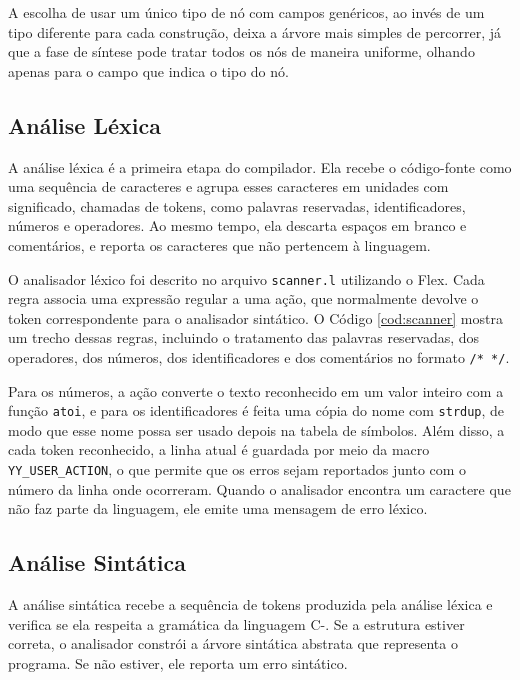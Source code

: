 \documentclass[
	12pt,				%
	oneside,
	a4paper,			%
	english,			%
	french,				%
	spanish,			%
	brazil,				%
	]{abntex2}
\begin{document}


A escolha de usar um único tipo de nó com campos genéricos, ao invés de um tipo diferente para cada construção, deixa a árvore mais simples de percorrer, já que a fase de síntese pode tratar todos os nós de maneira uniforme, olhando apenas para o campo que indica o tipo do nó.

\subsection{Análise Léxica}
A análise léxica é a primeira etapa do compilador. Ela recebe o código-fonte como uma sequência de caracteres e agrupa esses caracteres em unidades com significado, chamadas de tokens, como palavras reservadas, identificadores, números e operadores. Ao mesmo tempo, ela descarta espaços em branco e comentários, e reporta os caracteres que não pertencem à linguagem.

O analisador léxico foi descrito no arquivo \texttt{scanner.l} utilizando o Flex. Cada regra associa uma expressão regular a uma ação, que normalmente devolve o token correspondente para o analisador sintático. O Código \ref{cod:scanner} mostra um trecho dessas regras, incluindo o tratamento das palavras reservadas, dos operadores, dos números, dos identificadores e dos comentários no formato \texttt{/* */}.



Para os números, a ação converte o texto reconhecido em um valor inteiro com a função \texttt{atoi}, e para os identificadores é feita uma cópia do nome com \texttt{strdup}, de modo que esse nome possa ser usado depois na tabela de símbolos. Além disso, a cada token reconhecido, a linha atual é guardada por meio da macro \texttt{YY\_USER\_ACTION}, o que permite que os erros sejam reportados junto com o número da linha onde ocorreram. Quando o analisador encontra um caractere que não faz parte da linguagem, ele emite uma mensagem de erro léxico.

\subsection{Análise Sintática}
A análise sintática recebe a sequência de tokens produzida pela análise léxica e verifica se ela respeita a gramática da linguagem C-. Se a estrutura estiver correta, o analisador constrói a árvore sintática abstrata que representa o programa. Se não estiver, ele reporta um erro sintático.
\end{document}
